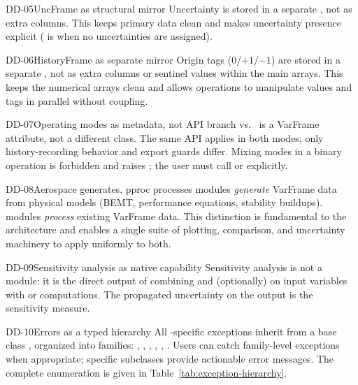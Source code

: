 \begin{ddbox}{DD-05}{UncFrame as structural mirror}
Uncertainty is stored in a separate , not as extra columns.
This keeps primary data clean and makes uncertainty presence explicit
( is  when no uncertainties are assigned).
\end{ddbox}

\begin{ddbox}{DD-06}{HistoryFrame as separate mirror}
Origin tags ($0$/$+1$/$-1$) are stored in a separate ,
not as extra columns or sentinel values within the main arrays. This keeps
the numerical arrays clean and allows operations to manipulate values and
tags in parallel without coupling.
\end{ddbox}

\begin{ddbox}{DD-07}{Operating modes as metadata, not API branch}
 vs.\  is a VarFrame attribute, not a
different class. The same API applies in both modes; only history-recording
behavior and export guards differ. Mixing modes in a binary operation is
forbidden and raises ; the user must call
 or 
explicitly.
\end{ddbox}

\begin{ddbox}{DD-08}{Aerospace generates, pproc processes}
 modules \emph{generate} VarFrame data from physical
models (BEMT, performance equations, stability buildups). 
modules \emph{process} existing VarFrame data. This distinction is
fundamental to the architecture and enables a single suite of plotting,
comparison, and uncertainty machinery to apply uniformly to both.
\end{ddbox}

\begin{ddbox}{DD-09}{Sensitivity analysis as native capability}
Sensitivity analysis is not a module: it is the direct output of
combining  and (optionally)
 on input variables with  or
 computations. The propagated uncertainty on the
output is the sensitivity measure.
\end{ddbox}

\begin{ddbox}{DD-10}{Errors as a typed hierarchy}
All \itc{}-specific exceptions inherit from a base class
, organized into families: ,
, , ,
, . Users can catch family-level
exceptions when appropriate; specific subclasses provide actionable error
messages. The complete enumeration is given in
Table~\ref{tab:exception-hierarchy}.
\end{ddbox}

